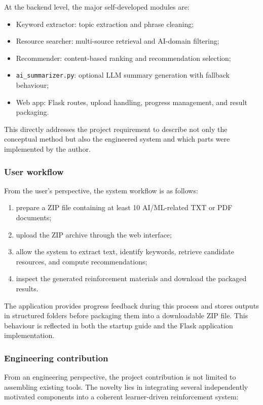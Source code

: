 \documentclass[10pt,journal,compsoc]{IEEEtran}
\begin{document}
At the backend level, the major self-developed modules are:

\begin{itemize}
\item Keyword extractor: topic extraction and phrase cleaning;
\item Resource searcher: multi-source retrieval and AI-domain filtering;
\item Recommender: content-based ranking and recommendation selection;
\item \texttt{ai\_summarizer.py}: optional LLM summary generation with fallback behaviour;
\item Web app: Flask routes, upload handling, progress management, and result packaging.
\end{itemize}

This directly addresses the project requirement to describe not only the conceptual method but also the engineered system and which parts were implemented by the author.

\subsubsection{User workflow}

From the user's perspective, the system workflow is as follows:

\begin{enumerate}
\item prepare a ZIP file containing at least 10 AI/ML-related TXT or PDF documents;
\item upload the ZIP archive through the web interface;
\item allow the system to extract text, identify keywords, retrieve candidate resources, and compute recommendations;
\item inspect the generated reinforcement materials and download the packaged results.
\end{enumerate}

The application provides progress feedback during this process and stores outputs in structured folders before packaging them into a downloadable ZIP file. This behaviour is reflected in both the startup guide and the Flask application implementation.

\subsubsection{Engineering contribution}

From an engineering perspective, the project contribution is not limited to assembling existing tools. The novelty lies in integrating several independently motivated components into a coherent learner-driven reinforcement system:
\end{document}
